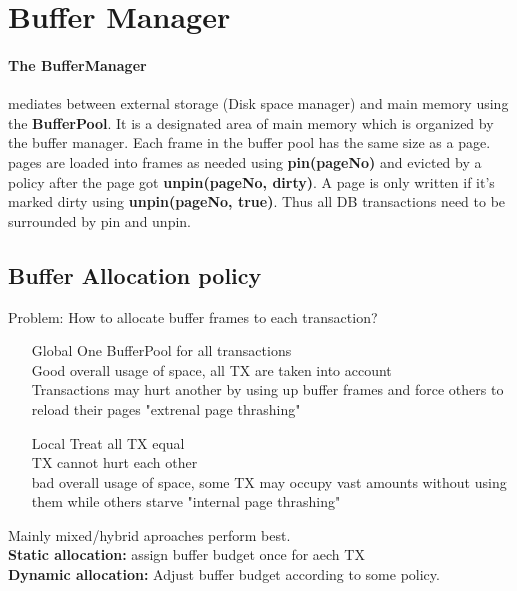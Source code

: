  
\section{Buffer Manager}
    \paragraph{The BufferManager} mediates between external storage (Disk space manager) and main memory using the \textbf{BufferPool}. It is a designated area of main memory which is organized by the buffer manager. Each frame in the buffer pool has the same size as a page. pages are loaded into frames as needed using \textbf{pin(pageNo)} and evicted by a policy after the page got \textbf{unpin(pageNo, dirty)}. A page is only written if it's marked dirty using \textbf{unpin(pageNo, true)}. Thus all DB transactions need to be surrounded by pin and unpin.

    \subsection{Buffer Allocation policy}
    Problem: How to allocate buffer frames to each transaction?
    
    \begin{itemize}
        \item[Global] One BufferPool for all transactions \\
        Good overall usage of space, all TX are taken into account \\
        Transactions may hurt another by using up buffer frames and force others to reload their pages "extrenal page thrashing" 
        \item[Local] Treat all TX equal \\
        TX cannot hurt each other \\
        bad overall usage of space, some TX may occupy vast amounts without using them while others starve "internal page thrashing"
    \end{itemize}
    Mainly mixed/hybrid aproaches perform best. \\
    \textbf{Static allocation:} assign buffer budget once for aech TX \\
    \textbf{Dynamic allocation:} Adjust buffer budget according to some policy. \\
    
